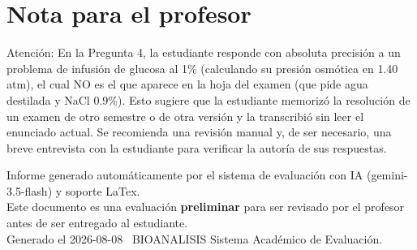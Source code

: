 \documentclass[11pt,a4paper]{article}
\begin{document}
\section*{Nota para el profesor}
\begin{tcolorbox}[
  enhanced, breakable,
  colback=yellow!8, colframe=yellow!60!black,
  fonttitle=\bfseries, coltitle=black,
  title={Observaciones para revisión manual},
  top=4pt, bottom=4pt, left=8pt, right=8pt,
]
Atención: En la Pregunta 4, la estudiante responde con absoluta precisión a un problema de infusión de glucosa al 1\% (calculando su presión osmótica en 1.40 atm), el cual NO es el que aparece en la hoja del examen (que pide agua destilada y NaCl 0.9\%). Esto sugiere que la estudiante memorizó la resolución de un examen de otro semestre o de otra versión y la transcribió sin leer el enunciado actual. Se recomienda una revisión manual y, de ser necesario, una breve entrevista con la estudiante para verificar la autoría de sus respuestas.
\end{tcolorbox}

\vspace{12pt}
\begin{center}
  \footnotesize\color{gray}
  Informe generado automáticamente por el sistema de evaluación con IA (gemini-3.5-flash) y soporte LaTex. \\
  Este documento es una evaluación \textbf{preliminar} para ser revisado por el profesor antes de ser entregado al 
  estudiante. \\
  Generado el 2026-08-08 \textbullet\ BIOANALISIS Sistema Académico de Evaluación.
  \end{center}
\end{document}
